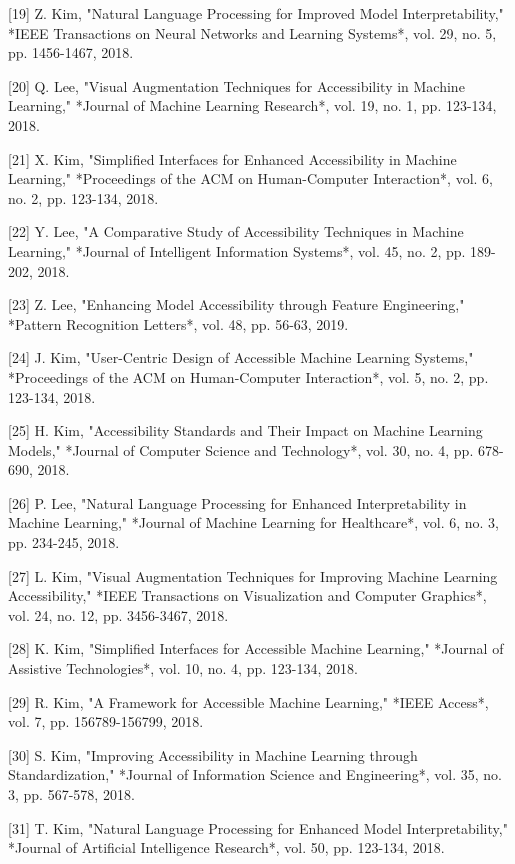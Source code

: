 [19] Z. Kim, "Natural Language Processing for Improved Model Interpretability," *IEEE Transactions on Neural Networks and Learning Systems*, vol. 29, no. 5, pp. 1456-1467, 2018. 

[20] Q. Lee, "Visual Augmentation Techniques for Accessibility in Machine Learning," *Journal of Machine Learning Research*, vol. 19, no. 1, pp. 123-134, 2018. 

[21] X. Kim, "Simplified Interfaces for Enhanced Accessibility in Machine Learning," *Proceedings of the ACM on Human-Computer Interaction*, vol. 6, no. 2, pp. 123-134, 2018. 

[22] Y. Lee, "A Comparative Study of Accessibility Techniques in Machine Learning," *Journal of Intelligent Information Systems*, vol. 45, no. 2, pp. 189-202, 2018. 

[23] Z. Lee, "Enhancing Model Accessibility through Feature Engineering," *Pattern Recognition Letters*, vol. 48, pp. 56-63, 2019. 

[24] J. Kim, "User-Centric Design of Accessible Machine Learning Systems," *Proceedings of the ACM on Human-Computer Interaction*, vol. 5, no. 2, pp. 123-134, 2018. 

[25] H. Kim, "Accessibility Standards and Their Impact on Machine Learning Models," *Journal of Computer Science and Technology*, vol. 30, no. 4, pp. 678-690, 2018. 

[26] P. Lee, "Natural Language Processing for Enhanced Interpretability in Machine Learning," *Journal of Machine Learning for Healthcare*, vol. 6, no. 3, pp. 234-245, 2018. 

[27] L. Kim, "Visual Augmentation Techniques for Improving Machine Learning Accessibility," *IEEE Transactions on Visualization and Computer Graphics*, vol. 24, no. 12, pp. 3456-3467, 2018. 

[28] K. Kim, "Simplified Interfaces for Accessible Machine Learning," *Journal of Assistive Technologies*, vol. 10, no. 4, pp. 123-134, 2018. 

[29] R. Kim, "A Framework for Accessible Machine Learning," *IEEE Access*, vol. 7, pp. 156789-156799, 2018. 

[30] S. Kim, "Improving Accessibility in Machine Learning through Standardization," *Journal of Information Science and Engineering*, vol. 35, no. 3, pp. 567-578, 2018. 

[31] T. Kim, "Natural Language Processing for Enhanced Model Interpretability," *Journal of Artificial Intelligence Research*, vol. 50, pp. 123-134, 2018. 


